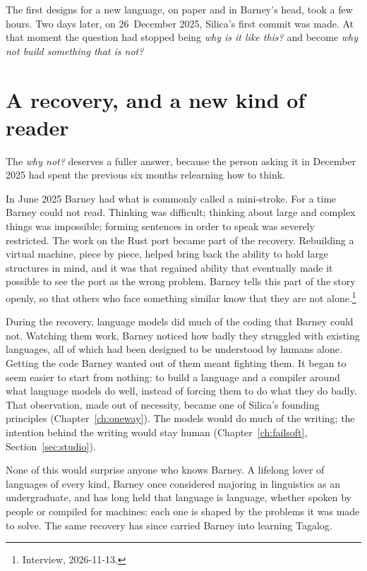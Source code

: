 The first designs for a new language, on paper and in Barney's head, took a few
hours. Two days later, on 26~December 2025, Silica's first commit was made. At
that moment the question had stopped being \emph{why is it like this?} and
become \emph{why not build something that is not?}

\section{A recovery, and a new kind of reader}

The \emph{why not?} deserves a fuller answer, because the person asking it in
December 2025 had spent the previous six months relearning how to think.

In June 2025 Barney had what is commonly called a mini-stroke. For a time
Barney could not read. Thinking was difficult; thinking about large and complex
things was impossible; forming sentences in order to speak was severely
restricted. The work on the Rust port became part of the recovery. Rebuilding a
virtual machine, piece by piece, helped bring back the ability to hold large
structures in mind, and it was that regained ability that eventually made it
possible to see the port as the wrong problem. Barney tells this part of the
story openly, so that others who face something similar know that they are not
alone.\footnote{Interview, 2026-11-13.}

During the recovery, language models did much of the coding that Barney could
not. Watching them work, Barney noticed how badly they struggled with existing
languages, all of which had been designed to be understood by humans alone.
Getting the code Barney wanted out of them meant fighting them. It began to seem
easier to start from nothing: to build a language and a compiler around what
language models do well, instead of forcing them to do what they do badly.
That observation, made out of necessity, became one of Silica's founding
principles (Chapter~\ref{ch:oneway}). The models would do much of the writing; the
intention behind the writing would stay human (Chapter~\ref{ch:failsoft},
Section~\ref{sec:studio}).

None of this would surprise anyone who knows Barney. A lifelong lover of
languages of every kind, Barney once considered majoring in linguistics as an
undergraduate, and has long held that language is language, whether spoken by
people or compiled for machines: each one is shaped by the problems it was made
to solve. The same recovery has since carried Barney into learning Tagalog.

